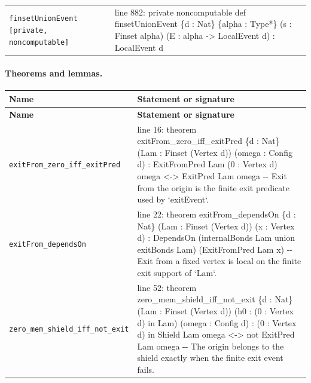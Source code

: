 \documentclass[10pt]{article}
\begin{document}
\begin{longtable}{>{\raggedright\arraybackslash}p{} >{\raggedright\arraybackslash}p{}}
\texttt{finsetUnionEvent [private,\allowbreak{} noncomputable]} & {\ttfamily\scriptsize line 882:\allowbreak{} private noncomputable def finsetUnionEvent \{d :\allowbreak{} Nat\} \{alpha :\allowbreak{} Type*\allowbreak{}\} (\allowbreak{}s :\allowbreak{} Finset alpha)\allowbreak{} (\allowbreak{}E :\allowbreak{} alpha -\allowbreak{}> LocalEvent d)\allowbreak{} :\allowbreak{} LocalEvent d} \\[0.45em]
\end{longtable}

\paragraph{Theorems and lemmas.}
\begin{longtable}{>{\raggedright\arraybackslash}p{} >{\raggedright\arraybackslash}p{}}
\textbf{Name} & \textbf{Statement or signature} \\
\hline
\endfirsthead
\textbf{Name} & \textbf{Statement or signature} \\
\hline
\endhead
\texttt{exitFrom\_\allowbreak{}zero\_\allowbreak{}iff\_\allowbreak{}exitPred} & {\ttfamily\scriptsize line 16:\allowbreak{} theorem exitFrom\_\allowbreak{}zero\_\allowbreak{}iff\_\allowbreak{}exitPred \{d :\allowbreak{} Nat\} (\allowbreak{}Lam :\allowbreak{} Finset (\allowbreak{}Vertex d)\allowbreak{})\allowbreak{} (\allowbreak{}omega :\allowbreak{} Config d)\allowbreak{} :\allowbreak{} ExitFromPred Lam (\allowbreak{}0 :\allowbreak{} Vertex d)\allowbreak{} omega <-\allowbreak{}> ExitPred Lam omega -\allowbreak{}-\allowbreak{} Exit from the origin is the finite exit predicate used by `exitEvent`.\allowbreak{}} \\[0.45em]
\texttt{exitFrom\_\allowbreak{}dependsOn} & {\ttfamily\scriptsize line 22:\allowbreak{} theorem exitFrom\_\allowbreak{}dependsOn \{d :\allowbreak{} Nat\} (\allowbreak{}Lam :\allowbreak{} Finset (\allowbreak{}Vertex d)\allowbreak{})\allowbreak{} (\allowbreak{}x :\allowbreak{} Vertex d)\allowbreak{} :\allowbreak{} DependsOn (\allowbreak{}internalBonds Lam union exitBonds Lam)\allowbreak{} (\allowbreak{}ExitFromPred Lam x)\allowbreak{} -\allowbreak{}-\allowbreak{} Exit from a fixed vertex is local on the finite exit support of `Lam`.\allowbreak{}} \\[0.45em]
\texttt{zero\_\allowbreak{}mem\_\allowbreak{}shield\_\allowbreak{}iff\_\allowbreak{}not\_\allowbreak{}exit} & {\ttfamily\scriptsize line 52:\allowbreak{} theorem zero\_\allowbreak{}mem\_\allowbreak{}shield\_\allowbreak{}iff\_\allowbreak{}not\_\allowbreak{}exit \{d :\allowbreak{} Nat\} (\allowbreak{}Lam :\allowbreak{} Finset (\allowbreak{}Vertex d)\allowbreak{})\allowbreak{} (\allowbreak{}h0 :\allowbreak{} (\allowbreak{}0 :\allowbreak{} Vertex d)\allowbreak{} in Lam)\allowbreak{} (\allowbreak{}omega :\allowbreak{} Config d)\allowbreak{} :\allowbreak{} (\allowbreak{}0 :\allowbreak{} Vertex d)\allowbreak{} in Shield Lam omega <-\allowbreak{}> not ExitPred Lam omega -\allowbreak{}-\allowbreak{} The origin belongs to the shield exactly when the finite exit event fails.\allowbreak{}} \\[0.45em]

\end{longtable}
\end{document}
